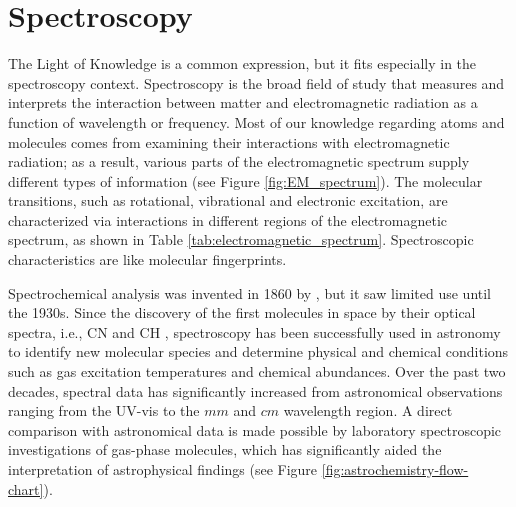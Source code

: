 \section{Spectroscopy}
\label{sec:spectroscopy}

The Light of Knowledge is a common expression, but it fits especially in the
spectroscopy context. Spectroscopy is the broad field of study that measures
and interprets the interaction between matter and electromagnetic radiation
as a function of wavelength or frequency. Most of our knowledge regarding atoms and molecules 
comes from examining their interactions with electromagnetic radiation; 
as a result, various parts of the electromagnetic spectrum supply
different types of information (see Figure \ref{fig:EM_spectrum}). The
molecular transitions, such as rotational, vibrational and electronic excitation, 
are characterized via interactions in different regions of the electromagnetic
spectrum, as shown in Table \ref{tab:electromagnetic_spectrum}. Spectroscopic
characteristics are like molecular fingerprints.



Spectrochemical analysis was invented in 1860 by
\citet{kirchhoff_chemical_1860}, but it saw limited use until the 1930s. Since
the discovery of the first molecules in space by their optical spectra, i.e.,
CN and CH \cite{dunham_jr_interstellar_1937, adams_quoted_1937,
    mckellar_evidence_1940, mckellar_wave_1940}, spectroscopy has been successfully
used in astronomy to identify new molecular species and determine physical and
chemical conditions such as gas excitation temperatures and chemical
abundances. Over the past two decades, spectral data has significantly increased from astronomical observations ranging from the UV-vis to the $mm$ and $cm$ wavelength region. A direct comparison with astronomical data is made possible
by laboratory spectroscopic investigations of gas-phase molecules, which has
significantly aided the interpretation of astrophysical findings (see Figure
\ref{fig:astrochemistry-flow-chart}).

